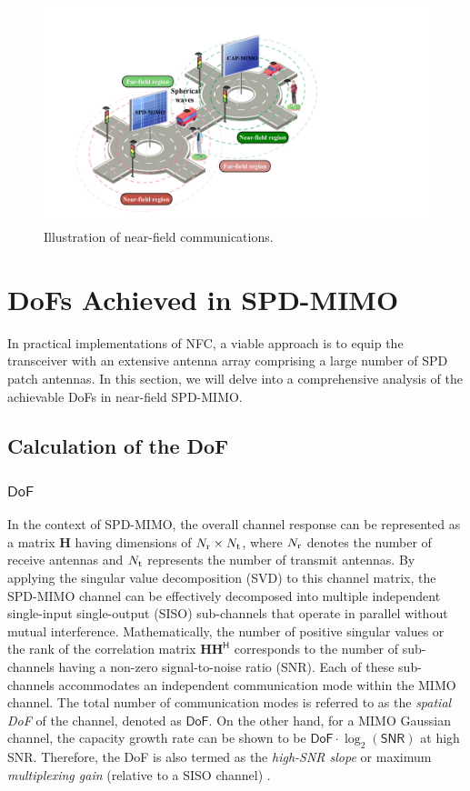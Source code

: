\documentclass[journal]{IEEEtran}
\theoremstyle{definition}
\begin{document}
\begin{figure}[!t]
\centering
\setlength{\abovecaptionskip}{0pt}
\includegraphics[height=0.35\textwidth]{NFC_MIMO.pdf}
\caption{Illustration of near-field communications.}
\label{System_Model}
\vspace{-10pt}
\end{figure}

\section{DoFs Achieved in SPD-MIMO}
In practical implementations of NFC, a viable approach is to equip the transceiver with an extensive antenna array comprising a large number of SPD patch antennas. %
In this section, we will delve into a comprehensive analysis of the achievable DoFs in near-field SPD-MIMO. %

\subsection{Calculation of the DoF}\label{Section_Calculation_SPD}
\subsubsection{${\mathsf{DoF}}$}
In the context of SPD-MIMO, the overall channel response can be represented as a matrix $\mathbf{H}$ having dimensions of $N_{\rm{r}}\times N_{\rm{t}}$, where $N_{\rm{r}}$ denotes the number of receive antennas and $N_{\rm{t}}$ represents the number of transmit antennas. By applying the singular value decomposition (SVD) to this channel matrix, the SPD-MIMO channel can be effectively decomposed into multiple independent single-input single-output (SISO) sub-channels that operate in parallel without mutual interference. Mathematically, the number of positive singular values or the rank of the correlation matrix $\mathbf{H}{\mathbf{H}}^{\mathsf{H}}$ corresponds to the number of sub-channels having a non-zero signal-to-noise ratio (SNR). Each of these sub-channels accommodates an independent communication mode within the MIMO channel. The total number of communication modes is referred to as the \emph{spatial DoF} of the channel, denoted as $\mathsf{DoF}$. On the other hand, for a MIMO Gaussian channel, the capacity growth rate can be shown to be ${\mathsf{DoF}}\cdot\log_2({\mathsf{SNR}})$ at high SNR. Therefore, the DoF is also termed as the \emph{high-SNR slope} or maximum \emph{multiplexing gain} (relative to a SISO channel) \cite{Liu2023}.
\end{document}
